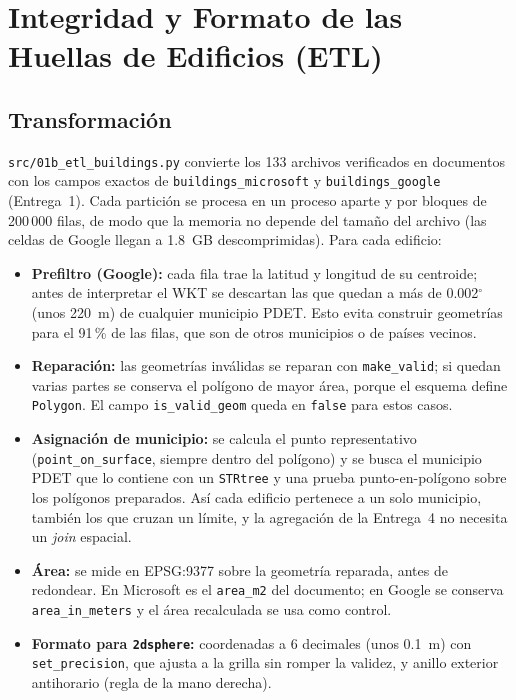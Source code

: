 
\section{Integridad y Formato de las Huellas de Edificios (ETL)}

\subsection{Transformación}
\texttt{src/01b\_etl\_buildings.py} convierte los 133 archivos verificados en documentos con los campos exactos de \texttt{buildings\_microsoft} y \texttt{buildings\_google} (Entrega~1). Cada partición se procesa en un proceso aparte y por bloques de 200\,000 filas, de modo que la memoria no depende del tamaño del archivo (las celdas de Google llegan a 1.8~GB descomprimidas). Para cada edificio:

\begin{itemize}
  \item \textbf{Prefiltro (Google):} cada fila trae la latitud y longitud de su centroide; antes de interpretar el WKT se descartan las que quedan a más de 0.002$^\circ$ (unos 220~m) de cualquier municipio PDET. Esto evita construir geometrías para el 91\,\% de las filas, que son de otros municipios o de países vecinos.
  \item \textbf{Reparación:} las geometrías inválidas se reparan con \texttt{make\_valid}; si quedan varias partes se conserva el polígono de mayor área, porque el esquema define \texttt{Polygon}. El campo \texttt{is\_valid\_geom} queda en \texttt{false} para estos casos.
  \item \textbf{Asignación de municipio:} se calcula el punto representativo (\texttt{point\_on\_surface}, siempre dentro del polígono) y se busca el municipio PDET que lo contiene con un \texttt{STRtree} y una prueba punto-en-polígono sobre los polígonos preparados. Así cada edificio pertenece a un solo municipio, también los que cruzan un límite, y la agregación de la Entrega~4 no necesita un \emph{join} espacial.
  \item \textbf{Área:} se mide en EPSG:9377 sobre la geometría reparada, antes de redondear. En Microsoft es el \texttt{area\_m2} del documento; en Google se conserva \texttt{area\_in\_meters} y el área recalculada se usa como control.
  \item \textbf{Formato para \texttt{2dsphere}:} coordenadas a 6 decimales (unos 0.1~m) con \texttt{set\_precision}, que ajusta a la grilla sin romper la validez, y anillo exterior antihorario (regla de la mano derecha).
\end{itemize}

